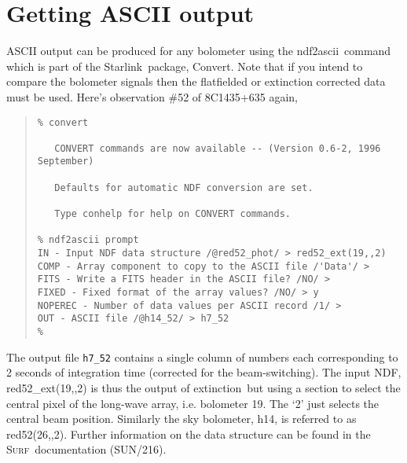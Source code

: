 \documentclass[twoside,11pt,fleqn]{article}
\newenvironment{myquote}{\begin{quote}\begin{small}}{\end{small}\end{quote}}
\newcommand{\starlink}{\htmladdnormallink{Starlink}{http://star-www.rl.ac.uk/}}
\newcommand{\convert}{\xref{{\sc Convert}}{sun55}{}}
\newcommand{\surf}{\xref{\textsc{Surf}}{sun216}{}}
\newcommand{\task}[1]{{\sf #1}}
\newcommand{\ext}{\xref{\task{extinction}}{sun216}{EXTINCTION}}
\newcommand{\ndfascii}{\xref{\task{ndf2ascii}}{sun55}{NDF2ASCII}}
\newcommand{\htmladdnormallink}[2]{#1}
\newcommand{\xref}[3]{#1}
\begin{document}
\appendix
\section{Getting ASCII output}

ASCII output can be produced for any bolometer using the \ndfascii\ command
which is part of the \starlink\ package, \convert.  Note that if you intend
to compare the bolometer signals then the flatfielded or extinction corrected
data must be used. Here's observation \#52 of 8C1435+635 again,

\begin{myquote}
\begin{verbatim}  
% convert
 
   CONVERT commands are now available -- (Version 0.6-2, 1996 September)
 
   Defaults for automatic NDF conversion are set.
 
   Type conhelp for help on CONVERT commands.
 
% ndf2ascii prompt
IN - Input NDF data structure /@red52_phot/ > red52_ext(19,,2)
COMP - Array component to copy to the ASCII file /'Data'/ > 
FITS - Write a FITS header in the ASCII file? /NO/ > 
FIXED - Fixed format of the array values? /NO/ > y
NOPEREC - Number of data values per ASCII record /1/ > 
OUT - ASCII file /@h14_52/ > h7_52
%
\end{verbatim}
\end{myquote}

The output file {\tt h7\_52} contains a single column of numbers each
corresponding to 2 seconds of integration time (corrected for the
beam-switching). The input NDF, red52\_ext(19,,2) is thus the output
of \ext\ but using a section to select the central pixel of
the long-wave array, i.e. bolometer 19.  The `2' just selects the
central beam position. Similarly the sky bolometer, h14, is referred
to as red52(26,,2). Further information on the data structure can be
found in the \surf\ documentation (\xref{SUN/216}{sun216}{}).

\end{document}
